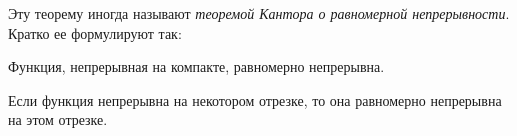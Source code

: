 Эту теорему иногда называют \textit{теоремой Кантора о равномерной непрерывности}. Кратко ее формулируют так:

\begin{thmn}
Функция, непрерывная на компакте, равномерно непрерывна.
\end{thmn}

\begin{cons}
Если функция непрерывна на некотором отрезке, то она равномерно непрерывна на этом отрезке. 
\end{cons}















